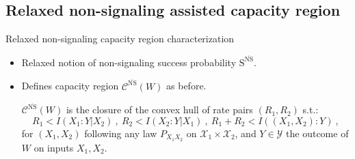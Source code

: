 \documentclass{beamer}
\theoremstyle{definition}
\theoremstyle{remark}
\begin{document}
\subsection{Relaxed non-signaling assisted capacity region}
\begin{frame}{Relaxed non-signaling capacity region characterization}
  \begin{itemize}
  \item Relaxed notion of non-signaling success probability $\mathrm{S}^{\overline{\mathrm{NS}}}$.
    \pause
    \bigskip
  \item Defines capacity region $\mathcal{C}^{\overline{\mathrm{NS}}}(W)$ as before.
    \pause
    \bigskip
      \begin{theorem}
        \label{theo:CharaNSrelaxed}
        $\mathcal{C}^{\overline{\mathrm{NS}}}(W)$ is the closure of the convex hull of rate pairs $(R_1,R_2)$ s.t.:
        \[ R_1 < I(X_1:Y|X_2)\ ,\ R_2 < I(X_2:Y|X_1)\ ,\ R_1+R_2 < I((X_1,X_2):Y) \ ,\]
        for $(X_1,X_2)$ following \alert{any law $P_{X_1X_2}$ on $\mathcal{X}_1 \times \mathcal{X}_2$}, and $Y \in \mathcal{Y}$ the outcome of $W$ on inputs $X_1,X_2$.
  \end{theorem}
  \end{itemize}
\end{frame}

%
\end{document}
